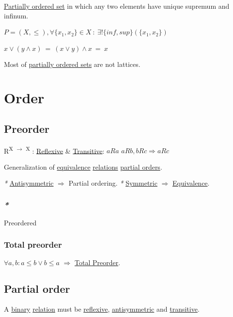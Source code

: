 \documentclass[a4paper,14pt,oneside]{book}
\begin{document}
\hyperref[org10063c5]{Partially ordered set} in which any two elements have unique supremum and infinum.

\(P = (X, \le ), \forall \{x_{1}, x_{2}\} \in X \ : \ \exists! \{inf, sup\}(\{x_{1},x_{2}\})\)

\(x \lor (y \land x) \ = \ (x \lor y) \land x \ = \ x\)

Most of \hyperref[orgc1b39bf]{partially ordered sets} are not lattices.

\section{\label{orgf77febb}Order}
\label{sec:org4c65a08}

\subsection{\label{orge612542}Preorder}
\label{sec:org604cac8}

R\textsuperscript{X \(\to\) X} : \hyperref[orgcf841cc]{Reflexive} \& \hyperref[orgb61ecd1]{Transitive}:
\(aRa\)
\(aRb, bRc \Rightarrow aRc\)

Generalization of \hyperref[org0ab5096]{equivalence} \hyperref[org6c914a7]{relations} \hyperref[org83c94df]{partial orders}.

\emph{*} \hyperref[org8b9d873]{Antisymmetric} \(\Rightarrow\) Partial ordering.
\emph{*} \hyperref[orgfc61b53]{Symmetric} \(\Rightarrow\) \hyperref[org0ab5096]{Equivalence}.

\subsubsection{\emph{*}}
\label{sec:org8209b75}

\label{orge2af8b6}Preordered

\subsubsection{\label{org481b3af}Total preorder}
\label{sec:org2a7ba0f}

\(\forall a,b : a \le b \lor b \le a\) \(\Rightarrow\) \hyperref[org481b3af]{Total Preorder}.

\subsection{\label{orgd8801ab}Partial order}
\label{sec:org04ed8ff}

A \hyperref[orgadebdb8]{binary} \hyperref[org9291137]{relation} must be \hyperref[orgcf841cc]{reflexive}, \hyperref[org8b9d873]{antisymmetric} and \hyperref[orgb61ecd1]{transitive}.
\end{document}
